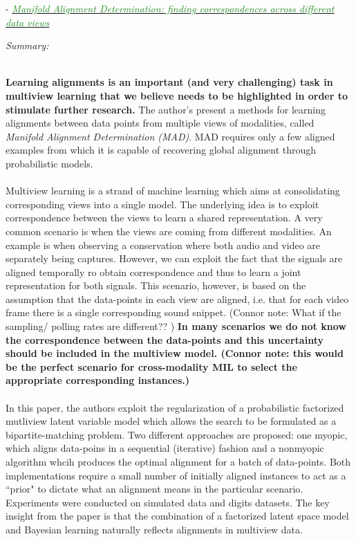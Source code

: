 \documentclass[]{article}
\newcommand{\paperentry}[4]{
            \hangindent=1cm
            \textcolor{red}{\cite{#1}} - \href{run:../References/#3}{\textcolor{ForestGreen}{\textit{#2}}}
            
            \noindent            
            \begin{minipage}[t]{0.1\linewidth}\hfill\end{minipage}
            \begin{minipage}[t]{0.8\linewidth}\textcolor{NavyBlue}{{\textit{Summary:}}}#4\end{minipage}
            \vspace{.25cm}
          }
\begin{document}
		
		\paperentry{Damianou2017ManifoldAlignmentDifferentDataView}
		{Manifold Alignment Determination: finding correspondences across different data views}
		{Manifold_Representation_Learning/Alignment/Damianou2017ManifoldAlignmentDifferentDataView.pdf}
		{}\\
		\textbf{Learning alignments is an important (and very challenging) task in multiview learning that we believe needs to be highlighted in order to stimulate further research.}  The author's present a methods for learning alignments between data points from multiple views of modalities, called \textit{Manifold Alignment Determination (MAD)}.  MAD requires only a few aligned examples  from which it is capable of recovering global alignment through probabilistic models.
		\\ \\
		Multiview learning is a strand of machine learning which aims at consolidating corresponding views into  a single model.  The underlying idea is to exploit correspondence between the views to learn a shared representation.  A very common scenario is when the views are coming from different modalities.  An example is when observing a conservation where both audio and video are separately being captures.  However, we can exploit the fact that the signals are aligned temporally ro obtain correspondence and thus to learn a joint representation for both signals.  This scenario, however, is based on the assumption that the data-points in each view are aligned, i.e. that for each video frame there is a single corresponding sound snippet. (Connor note: What if the sampling/ polling rates are different?? ) \textbf{In many scenarios we do not know the correspondence between the data-points and this uncertainty should be included in the multiview model. (Connor note: this would be the perfect scenario for cross-modality MIL to select the appropriate corresponding instances.)}
		\\ \\
		In this paper, the authors exploit the regularization of a probabilistic factorized mutliview latent variable model which allows the search to be formulated as a bipartite-matching problem.  Two different approaches are proposed: one myopic, which aligns data-poins in a sequential (iterative) fashion and a nonmyopic algorithm whcih produces the optimal alignment for a batch of data-points. Both implementations require a small number of initially aligned instances to act as a ``prior" to dictate what an alignment means in the particular scenario.  Experiments were conducted on simulated data and digits datasets.  The key insight from the paper is that the combination of a factorized latent space model and Bayesian learning naturally reflects alignments in multiview data. \\
		
\end{document}
